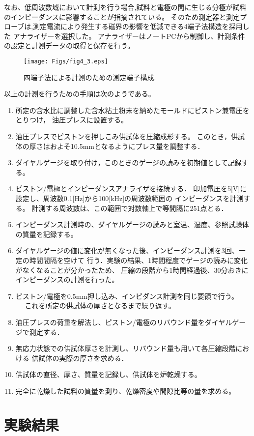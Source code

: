 なお、低周波数域において計測を行う場合,試料と電極の間に生じる分極が試料のインピーダンスに影響することが指摘されている。
そのため測定器と測定プローブは,測定電流により発生する磁界の影響を低減できる4端子法構造を採用した
アナライザーを選択した。
アナライザーはノートPCから制御し、計測条件の設定と計測データの取得と保存を行う。
\begin{figure}[h]
	\begin{center}
	\texttt{[image: Figs/fig4\_3.eps]} 
	\end{center}
	\caption{
		四端子法による計測のための測定端子構成.
	} 
	\label{fig:fig4_3}
\end{figure}
以上の計測を行うための手順は次のようである。
\begin{enumerate}
\item
	所定の含水比に調整した含水粘土粉末を納めたモールドにピストン兼電圧をとりつけ，
	油圧プレスに設置する。
\item
	油圧プレスでピストンを押しこみ供試体を圧縮成形する。
	このとき，供試体の厚さはおよそ10.5mmとなるようにプレス量を調整する．
\item
	ダイヤルゲージを取り付け，このときのゲージの読みを初期値として記録する。
\item
	ピストン/電極とインピーダンスアナライザを接続する．
	印加電圧を5[V]に設定し、周波数0.1[Hz]から100[kHz]の周波数範囲の
	インピーダンスを計測する。
	計測する周波数は、この範囲で対数軸上で等間隔に251点とる．
\item
	インピーダンス計測時の、ダイヤルゲージの読みと室温、湿度、参照試験体の質量を記録する。
\item
	ダイヤルゲージの値に変化が無くなった後、インピーダンス計測を3回、一定の時間間隔を空けて
	行う．実験の結果、1時間程度でゲージの読みに変化がなくなることが分かったため、
	圧縮の段階から1時間経過後、30分おきにインピーダンスの計測を行った。
\item
	ピストン/電極を0.5mm押し込み、インピダンス計測を同じ要領で行う。
　	これを所定の供試体の厚さとなるまで繰り返す。
\item
	油圧プレスの荷重を解法し、ピストン/電極のリバウンド量をダイヤルゲージで測定する．
\item
	無応力状態での供試体厚さを計測し、リバウンド量も用いて各圧縮段階における
	供試体の実際の厚さを求める．
\item
	供試体の直径、厚さ、質量を記録し、供試体を炉乾燥する。
\item
	完全に乾燥した試料の質量を測り、乾燥密度や間隙比等の量を求める。		
\end{enumerate}\section{実験結果}

